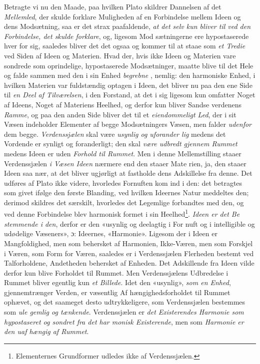 Betragte vi nu den Maade, paa hvilken Plato skildrer
Dannelsen af det \emph{Mellemled}, der skulde forklare Muligheden
af en Forbindelse mellem Ideen og dens Modsætning, saa er
det strax paafaldende, \emph{at det selv kun bliver til ved den
Forbindelse, det skulde forklare}, og, ligesom Mod\-%
sætningerne ere hypostaserede hver for sig, saaledes bliver det
det ogsaa og kommer til at staae som \emph{et Tredie} ved Siden
af Ideen og Materien. Hvad der, hvis ikke Ideen og Materien
vare sondrede som oprindelige, hypostaserede Modsætninger,
maatte blive til det Hele og falde sammen med den i sin
Enhed \emph{begrebne} , nemlig: den harmoniske Enhed, i
hvilken Materien var fuldstændig optagen i Ideen, det bliver
nu paa den ene Side til \emph{en Deel af Tilværelsen}, i den
Forstand, at det i sig ligesom kun omfatter Noget af Ideens,
 \setcounter{footnote}{0}
Noget af Materiens Heelhed, og derfor kun bliver Sandse\-%
verdenens \emph{Ramme}, og paa den anden Side bliver det til et
\emph{eiendommeligt Led}, der i sit Væsen indeholder Elementer
af begge Modsætningers Væsen, men falder \emph{udenfor} dem
begge. \emph{Verdenssjælen} skal være \emph{usynlig og uforander\-%
lig} medens det Vordende er synligt og foranderligt; den skal
\emph{være udbredt gjennem Rummet} medens Ideen er uden
\emph{Forhold til Rummet}. Men i denne Mellemstilling staaer
Verdenssjælen \emph{i Væsen Ideen} nærmere end den staaer Mate\-%
rien, ja, den staaer Ideen saa nær, at det bliver ugjørligt at
fastholde dens Adskillelse fra denne. Det udføres af Plato
ikke videre, hvorledes Fornuften kom ind i den: det betragtes
som givet ifølge den første Blanding, ved hvilken Ideernes
Natur meddeltes den; derimod skildres det særskilt, hvorledes
det Legemlige forbandtes med den, og ved denne Forbindelse
blev harmonisk formet i sin Heelhed\footnote{Elementernes Grundformer
udledes ikke af Verdenssjælen.}. \emph{Ideen er det Be\-%
stemmende i den}, derfor er den «usynlig og deelagtig i For\-%
nuft og i intelligible og udødelige Væseners», ɔ: Ideernes,
«Harmonie». Ligesom der i Ideen er Mangfoldighed, men
som behersket af Harmonien, Ikke-Væren, men som Forskjel
i Væren, som Form for Væren, saaledes er i Verdenssjælen
Flerheden bestemt ved Talforholdene, Andetheden behersket
af Enheden. Det Adskillende fra Ideen vilde derfor kun blive
Forholdet til Rummet. Men Verdenssjælens Udbredelse i
Rummet bliver egentlig kun \emph{et Billede}. Idet den «usynlig»,
\emph{som en Enhed}, gjennemtrænger Verden, er væsentlig Af\-%
hængighedsforholdet til Rummet ophævet, og det saameget
desto udtrykkeligere, som Verdenssjælen bestemmes som \emph{ule\-%
gemlig og tænkende}. Verdenssjælen er \emph{det Existerendes
Harmonie som hypostaseret og sondret fra det har\-%
monisk Existerende}, men som \emph{Harmonie er den uaf\-%
hængig af Rummet}.

